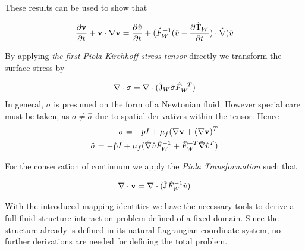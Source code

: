 These results can be used to show that

\begin{align*}
\frac{\partial \mathbf{v}}{\partial t} + \mathbf{v} \cdot \nabla \mathbf{v} =
\frac{\partial \hat{v}}{\partial t} + (\hat{F}_W^{-1}(\hat{v} - \frac{\partial \text{\^{T}}_W}{\partial t}) \cdot \hat{\nabla}) \hat{v}
\end{align*}

By applying \textit{the first Piola Kirchhoff stress tensor} directly we transform the surface stress by 

\begin{align*}
\nabla \cdot \sigma = \nabla \cdot (\text{\^{J}}_W \hat{\sigma}\hat{F}_W^{-T})
\end{align*}
In general, $\sigma$ is presumed on the form of a Newtonian fluid.
However special care must be taken, as $\sigma \neq \hat{\sigma}$ due to spatial derivatives within the tensor. Hence 
\begin{align*}
\sigma = -p I + \mu_f(\nabla \mathbf{v} + (\nabla \mathbf{v})^T \\
\hat{\sigma} = -\text{\^{p}} I + \mu_f(\hat{\nabla}\hat{v}\hat{F}_W^{-1} +\hat{F}_W^{-T}\hat{\nabla}\hat{v}^T )
\end{align*} 

For the conservation of continuum we apply the \textit{Piola Transformation} such that

\begin{align*}
\nabla \cdot \mathbf{v} = \nabla \cdot (\text{\^{J}} \hat{F}_W^{-1} \hat{v})
\end{align*}

With the introduced mapping identities we have the necessary tools to derive a full fluid-structure interaction problem defined of a fixed domain. Since the structure already is defined in its natural Lagrangian coordinate system, no further derivations are needed for defining the total problem.

